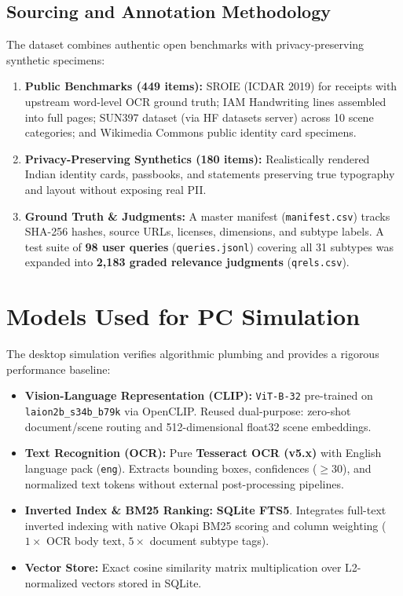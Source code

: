 \documentclass[10.5pt,twocolumn]{article}
\begin{document}
\subsection{Sourcing and Annotation Methodology}
The dataset combines authentic open benchmarks with privacy-preserving synthetic specimens:
\begin{enumerate}
    \item \textbf{Public Benchmarks (449 items):} SROIE (ICDAR 2019) for receipts with upstream word-level OCR ground truth; IAM Handwriting lines assembled into full pages; SUN397 dataset (via HF datasets server) across 10 scene categories; and Wikimedia Commons public identity card specimens.
    \item \textbf{Privacy-Preserving Synthetics (180 items):} Realistically rendered Indian identity cards, passbooks, and statements preserving true typography and layout without exposing real PII.
    \item \textbf{Ground Truth \& Judgments:} A master manifest (\texttt{manifest.csv}) tracks SHA-256 hashes, source URLs, licenses, dimensions, and subtype labels. A test suite of \textbf{98 user queries} (\texttt{queries.jsonl}) covering all 31 subtypes was expanded into \textbf{2,183 graded relevance judgments} (\texttt{qrels.csv}).
\end{enumerate}

\section{Models Used for PC Simulation}
The desktop simulation verifies algorithmic plumbing and provides a rigorous performance baseline:
\begin{itemize}
    \item \textbf{Vision-Language Representation (CLIP):} \texttt{ViT-B-32} pre-trained on \texttt{laion2b\_s34b\_b79k} via OpenCLIP. Reused dual-purpose: zero-shot document/scene routing and 512-dimensional float32 scene embeddings.
    \item \textbf{Text Recognition (OCR):} Pure \textbf{Tesseract OCR (v5.x)} with English language pack (\texttt{eng}). Extracts bounding boxes, confidences ($\ge 30$), and normalized text tokens without external post-processing pipelines.
    \item \textbf{Inverted Index \& BM25 Ranking:} \textbf{SQLite FTS5}. Integrates full-text inverted indexing with native Okapi BM25 scoring and column weighting ($1\times$ OCR body text, $5\times$ document subtype tags).
    \item \textbf{Vector Store:} Exact cosine similarity matrix multiplication over L2-normalized vectors stored in SQLite.
\end{itemize}
\end{document}
